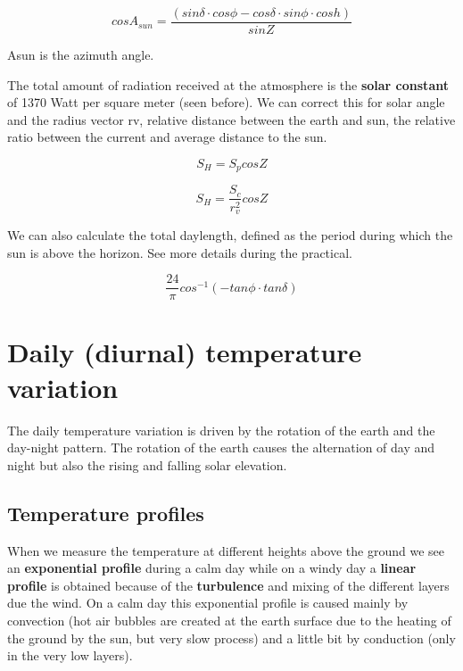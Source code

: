 \documentclass[12pt,oneside]{book}
\begin{document}
\begin{equation} 
  cos A_{sun} = \frac{\left(sin \delta \cdot cos \phi - cos \delta \cdot sin \phi \cdot cos h \right)} {sin Z}
   \label{eq:EqAsun}
\end{equation}

Asun is the azimuth angle.

The total amount of radiation received at the atmosphere is the
\textbf{solar constant} of 1370 Watt per square meter (seen before). We
can correct this for solar angle and the radius vector rv, relative
distance between the earth and sun, the relative ratio between the
current and average distance to the sun.

\begin{equation} 
   S_H = S_p cos Z
   \label{eq:Eqdist1}
\end{equation}

\begin{equation} 
   S_H = \frac{S_c}{r_v^{2}} cos Z
   \label{eq:Eqdist2}
\end{equation}

We can also calculate the total daylength, defined as the period during
which the sun is above the horizon. See more details during the
practical.

\begin{equation} 
   \frac{24}{\pi} cos^{-1}\left(-tan\phi \cdot tan \delta \right)
   \label{eq:Eqdaylength}
\end{equation}

\section{Daily (diurnal) temperature
variation}\label{daily-diurnal-temperature-variation}

The daily temperature variation is driven by the rotation of the earth
and the day-night pattern. The rotation of the earth causes the
alternation of day and night but also the rising and falling solar
elevation.

\subsection{Temperature profiles}\label{temperature-profiles}

When we measure the temperature at different heights above the ground we
see an \textbf{exponential profile} during a calm day while on a windy
day a \textbf{linear profile} is obtained because of the
\textbf{turbulence} and mixing of the different layers due the wind. On
a calm day this exponential profile is caused mainly by convection (hot
air bubbles are created at the earth surface due to the heating of the
ground by the sun, but very slow process) and a little bit by conduction
(only in the very low layers).
\end{document}
